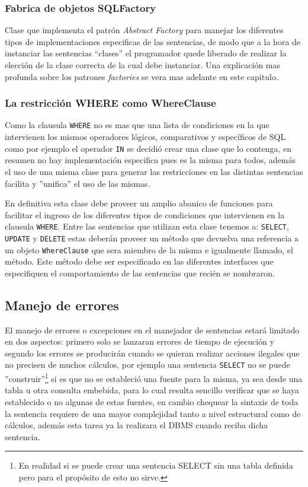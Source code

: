 \subsubsection{Fabrica de objetos SQLFactory}
Clase que implementa el patrón \textit{Abstract Factory} para manejar los diferentes tipos de implementaciones especificas de las sentencias, de modo que a la hora de instanciar las sentencias ``clases'' el programador quede liberado de realizar la elección de la clase correcta de la cual debe instanciar. Una explicación mas profunda sobre los patrones \textit{factories} se vera mas adelante en este capitulo.
%
\subsubsection{La restricción WHERE como WhereClause}
Como la clausula \verb=WHERE= no es mas que una lista de condiciones en la que intervienen los mismos operadores lógicos, comparativos y específicos de SQL como por ejemplo el operador \verb=IN= se decidió crear una clase que lo contenga, en resumen no hay implementación especifica pues es la misma para todos, además el uso de una misma clase para generar las restricciones en las distintas sentencias facilita y ''unifica'' el uso de las mismas.

En definitiva esta clase debe proveer un amplio abanico de funciones para facilitar el ingreso de los diferentes tipos de condiciones que intervienen en la clausula \verb=WHERE=. Entre las sentencias que utilizan esta clase tenemos a: \verb=SELECT=, \verb=UPDATE= y \verb=DELETE= estas deberán proveer un método que devuelva una referencia a un objeto \verb=WhereClause= que sera miembro de la misma e igualmente llamado, el método. Este método debe ser especificado en las diferentes interfaces que especifiquen el comportamiento de las sentencias que recién se nombraron. 
%
\subsection{Manejo de errores}
El manejo de errores o excepciones en el manejador de sentencias estará limitado en dos aspectos: primero solo se lanzaran errores de tiempo de ejecución y segundo los errores se producirán cuando se quieran realizar acciones ilegales que no precisen de muchos cálculos, por ejemplo una sentencia \verb=SELECT= no se puede ''construir''\footnote{En realidad si se puede crear una sentencia SELECT sin una tabla definida pero para el propósito de \jj esto no sirve.} si es que no se estableció una fuente para la misma, ya sea  desde una tabla u otra consulta embebida, para lo cual resulta sencillo verificar que se haya establecido o no algunas de estas fuentes, en cambio chequear la sintaxis de toda la sentencia requiere de una mayor complejidad tanto a nivel estructural como de cálculos, además esta tarea ya la realizara el DBMS cuando reciba dicha sentencia.
%
